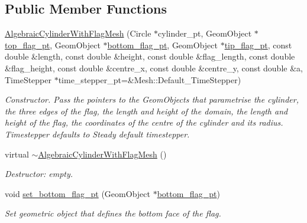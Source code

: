 \subsection*{Public Member Functions}
\begin{DoxyCompactItemize}
\item 
\hyperlink{classoomph_1_1AlgebraicCylinderWithFlagMesh_a2c307b804fee56aa620ea414b41883d5}{Algebraic\+Cylinder\+With\+Flag\+Mesh} (Circle $\ast$cylinder\+\_\+pt, Geom\+Object $\ast$\hyperlink{classoomph_1_1AlgebraicCylinderWithFlagMesh_a06bc13adad4aaa037d989bba9e3bf79d}{top\+\_\+flag\+\_\+pt}, Geom\+Object $\ast$\hyperlink{classoomph_1_1AlgebraicCylinderWithFlagMesh_a9c362fcc5edeb1b6e773f27a83778495}{bottom\+\_\+flag\+\_\+pt}, Geom\+Object $\ast$\hyperlink{classoomph_1_1AlgebraicCylinderWithFlagMesh_ad6d22aaa02d79e3c740b06d98a1597ea}{tip\+\_\+flag\+\_\+pt}, const double \&length, const double \&height, const double \&flag\+\_\+length, const double \&flag\+\_\+height, const double \&centre\+\_\+x, const double \&centre\+\_\+y, const double \&a, Time\+Stepper $\ast$time\+\_\+stepper\+\_\+pt=\&Mesh\+::\+Default\+\_\+\+Time\+Stepper)
\begin{DoxyCompactList}\small\item\em Constructor. Pass the pointers to the Geom\+Objects that parametrise the cylinder, the three edges of the flag, the length and height of the domain, the length and height of the flag, the coordinates of the centre of the cylinder and its radius. Timestepper defaults to Steady default timestepper. \end{DoxyCompactList}\item 
virtual \hyperlink{classoomph_1_1AlgebraicCylinderWithFlagMesh_ac7e92a8dc3add0cd1f666dc8c9f8ca6f}{$\sim$\+Algebraic\+Cylinder\+With\+Flag\+Mesh} ()
\begin{DoxyCompactList}\small\item\em Destructor\+: empty. \end{DoxyCompactList}\item 
void \hyperlink{classoomph_1_1AlgebraicCylinderWithFlagMesh_a6aeef710528a9d8dd51023dd6ee131ea}{set\+\_\+bottom\+\_\+flag\+\_\+pt} (Geom\+Object $\ast$\hyperlink{classoomph_1_1AlgebraicCylinderWithFlagMesh_a9c362fcc5edeb1b6e773f27a83778495}{bottom\+\_\+flag\+\_\+pt})
\begin{DoxyCompactList}\small\item\em Set geometric object that defines the bottom face of the flag. \end{DoxyCompactList}\item 

\end{DoxyCompactItemize}
